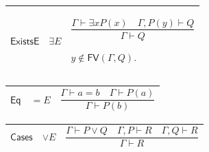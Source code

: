 \documentclass[11pt]{amsart}
\newlength{\FTCThreeColumnBody}
\begin{document}
{\noindent
\begin{tabular}{|@{}>{\centering\arraybackslash}m{0.176056\FTCThreeColumnBody}|>{\centering\arraybackslash}m{0.225352\FTCThreeColumnBody}|>{\centering\arraybackslash}m{0.598591\FTCThreeColumnBody}|}\hline
\hypertarget{rule:ExistsE}{$\displaystyle \textsf{ExistsE}$} & $\displaystyle \exists E$ & \rule[-3.3ex]{0pt}{7.8ex}$\displaystyle \dfrac{\Gamma\vdash\exists xP(x)\quad\Gamma,P(y)\vdash Q}{\Gamma\vdash Q}$\par
$\displaystyle y\notin\textsf{FV}(\Gamma,Q).$\\ \hline
\end{tabular}%
\par\setlength{\parskip}{0pt}\nointerlineskip
\noindent
\begin{tabular}{|@{}>{\centering\arraybackslash}m{0.176056\FTCThreeColumnBody}|>{\centering\arraybackslash}m{0.225352\FTCThreeColumnBody}|>{\centering\arraybackslash}m{0.598591\FTCThreeColumnBody}|}\hline
\hypertarget{rule:Eq}{$\displaystyle \textsf{Eq}$} & $\displaystyle =E$ & \rule[-3.3ex]{0pt}{7.8ex}$\displaystyle \dfrac{\Gamma\vdash a=b\quad\Gamma\vdash P(a)}{\Gamma\vdash P(b)}$\\ \hline
\end{tabular}%
\par\setlength{\parskip}{0pt}\nointerlineskip
\noindent
\begin{tabular}{|@{}>{\centering\arraybackslash}m{0.176056\FTCThreeColumnBody}|>{\centering\arraybackslash}m{0.225352\FTCThreeColumnBody}|>{\centering\arraybackslash}m{0.598591\FTCThreeColumnBody}|}\hline
\hypertarget{rule:Cases}{$\displaystyle \textsf{Cases}$} & $\displaystyle \vee E$ & \rule[-3.3ex]{0pt}{7.8ex}$\displaystyle \dfrac{\Gamma\vdash P\lor Q\quad\Gamma,P\vdash R\quad\Gamma,Q\vdash R}{\Gamma\vdash R}$\\ \hline
\end{tabular}%
\par
}
\end{document}
